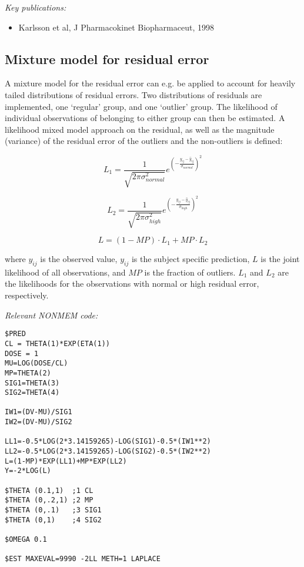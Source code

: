 \documentclass[a4paper,11pt]{article}
\begin{document}
\noindent \emph{Key publications:}
\begin{itemize}
\item Karlsson et al, J Pharmacokinet Biopharmaceut, 1998
\end{itemize}

\subsection{Mixture model for residual error}
A mixture model for the residual error can e.g. be applied to account
for heavily tailed distributions of residual errors. Two distributions
of residuals are implemented, one `regular' group, and one `outlier'
group. The likelihood of individual observations of belonging to
either group can then be estimated. A likelihood mixed model approach
on the residual, as well as the magnitude (variance) of the residual
error of the outliers and the non-outliers is defined:

\begin{equation}
L_1 = \frac{1}{\sqrt{2 \pi {\sigma^2_{normal}}}} e^{{\left( - \frac{y_{ij} - \hat{y}_{ij}}{\sigma_{normal}} \right)}^2}
\end{equation}

\begin{equation}
L_2 = \frac{1}{\sqrt{2 \pi {\sigma^2_{high}}}} e^{{\left( - \frac{y_{ij} - \hat{y}_{ij}}{\sigma_{high}} \right)}^2} 
\end{equation}

\begin{equation}
L = (1-MP) \cdot L_1 + MP \cdot L_2
\end{equation}

where $y_{ij}$ is the observed value, $y_{ij}$ is the subject specific prediction, $L$ is the joint
likelihood of all observations, and $MP$ is the fraction of outliers. $L_1$ and $L_2$ are the
likelihoods for the observations with normal or high residual error, respectively.

\noindent \emph{Relevant NONMEM code:}
\begin{lstlisting}
$PRED
CL = THETA(1)*EXP(ETA(1))
DOSE = 1
MU=LOG(DOSE/CL)
MP=THETA(2)
SIG1=THETA(3)
SIG2=THETA(4)

IW1=(DV-MU)/SIG1
IW2=(DV-MU)/SIG2

LL1=-0.5*LOG(2*3.14159265)-LOG(SIG1)-0.5*(IW1**2)
LL2=-0.5*LOG(2*3.14159265)-LOG(SIG2)-0.5*(IW2**2)
L=(1-MP)*EXP(LL1)+MP*EXP(LL2)
Y=-2*LOG(L)

$THETA (0.1,1)  ;1 CL
$THETA (0,.2,1) ;2 MP
$THETA (0,.1)   ;3 SIG1
$THETA (0,1)    ;4 SIG2

$OMEGA 0.1

$EST MAXEVAL=9990 -2LL METH=1 LAPLACE 
\end{lstlisting}
\end{document}
